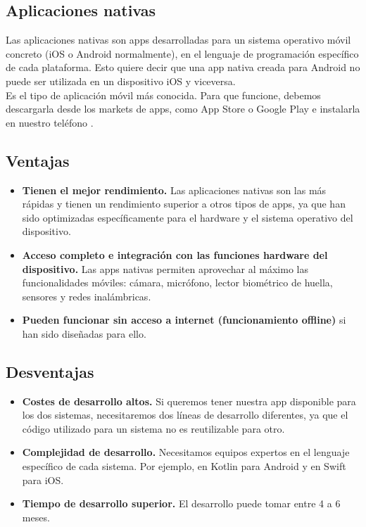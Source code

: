 \subsection{Aplicaciones nativas}
Las aplicaciones nativas son apps desarrolladas para un sistema operativo móvil concreto (iOS o Android normalmente), en el lenguaje de programación específico de cada plataforma. Esto quiere decir que una app nativa creada para Android no puede ser utilizada en un dispositivo iOS y viceversa. \\

Es el tipo de aplicación móvil más conocida. Para que funcione, debemos descargarla desde los markets de apps, como App Store o Google Play e instalarla en nuestro teléfono \cite{CitaA02}.

\subsection*{Ventajas}
\begin{itemize}
	\item \textbf{Tienen el mejor rendimiento.} Las aplicaciones nativas son las más rápidas y tienen un rendimiento superior a otros tipos de apps, ya que han sido optimizadas específicamente para el hardware y el sistema operativo del dispositivo.
	\item \textbf{Acceso completo e integración con las funciones hardware del dispositivo.} Las apps nativas permiten aprovechar al máximo las funcionalidades móviles: cámara, micrófono, lector biométrico de huella, sensores y redes inalámbricas.
	\item \textbf{Pueden funcionar sin acceso a internet (funcionamiento offline)} si han sido diseñadas para ello.
\end{itemize}

\subsection*{Desventajas}
\begin{itemize}
	\item \textbf{Costes de desarrollo altos.} Si queremos tener nuestra app disponible para los dos sistemas, necesitaremos dos líneas de desarrollo diferentes, ya que el código utilizado para un sistema no es reutilizable para otro.
	\item \textbf{Complejidad de desarrollo.} Necesitamos equipos expertos en el lenguaje específico de cada sistema. Por ejemplo, en Kotlin para Android y en Swift para iOS.
	\item \textbf{Tiempo de desarrollo superior.} El desarrollo puede tomar entre 4 a 6 meses.
\end{itemize}

